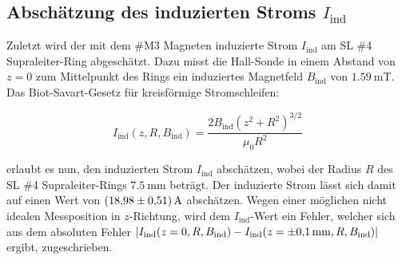\subsection{Abschätzung des induzierten Stroms $I_{\text{ind}}$}
\label{sec:ind}
Zuletzt wird der mit dem \#M3 Magneten induzierte Strom $I_{\text{ind}}$ am SL
\#4 Supraleiter-Ring abgeschätzt. Dazu misst die Hall-Sonde in einem Abstand von
$z=0$ zum Mittelpunkt des Rings ein induziertes Magnetfeld $B_{\text{ind}}$ von
$\SI{1,59}{\milli\tesla}$. Das Biot-Savart-Gesetz für kreisförmige Stromschleifen:

\begin{equation*}
	I_{\text{ind}}(z,R,B_{\text{ind}}) = \frac{2B_{\text{ind}}(z^2+R^2)^{3/2}}{\mu_0R^2}
\label{AF6}
\end{equation*}

\noindent
erlaubt es nun, den induzierten Strom $I_{\text{ind}}$ abschätzen, wobei der
Radius $R$ des SL \#4 Supraleiter-Rings $\SI{7,5}{\milli\meter}$ beträgt. Der
induzierte Strom lässt sich damit auf einen Wert von $\SI{18.98\pm0.51}{\ampere}$
abschätzen. Wegen einer möglichen nicht idealen Messposition in $z$-Richtung,
wird dem $I_{\text{ind}}$-Wert ein Fehler, welcher sich aus dem absoluten Fehler
$|I_{\text{ind}}(z=0,R,B_{\text{ind}}) - I_{\text{ind}}(z=\SI{\pm0.1}{\milli\meter},R,B_{\text{ind}})|$
ergibt, zugeschrieben.
